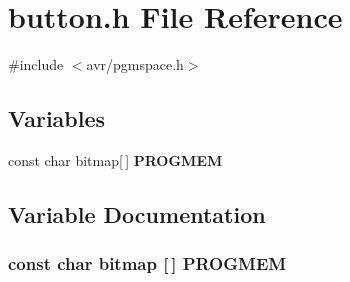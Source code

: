 \section{button.h File Reference}
\label{button_8h}
{\ttfamily \#include $<$avr/pgmspace.h$>$}\par
\subsection*{Variables}
\begin{DoxyCompactItemize}
\item 
const char bitmap[$\,$] {\bf PROGMEM}
\end{DoxyCompactItemize}


\subsection{Variable Documentation}
\subsubsection[{PROGMEM}]{\setlength{\rightskip}{0pt plus 5cm}const char bitmap [$\,$] {\bf PROGMEM}}\label{button_8h_a64743106711974bd687d7ed5a4d2344d}
